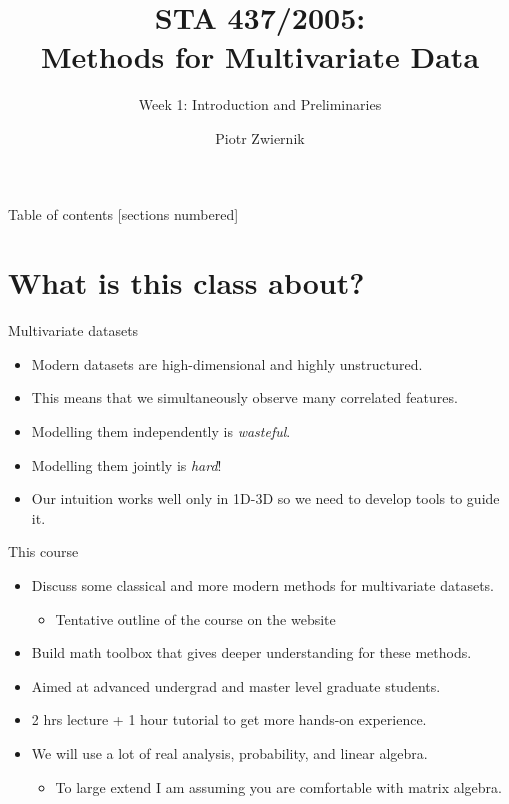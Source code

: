 \documentclass[11pt,handout,aspectratio=169]{beamer}
\title[STA437-Week1]{STA 437/2005: \\ Methods for Multivariate Data}
\subtitle[]{Week 1: Introduction and Preliminaries}
\author[Prob Learning]{Piotr Zwiernik}
\institute[UofT]{University of Toronto}
\date{}
\begin{document}
\maketitle

\begin{frame}{Table of contents}
  [sections numbered]
  \tableofcontents%
\end{frame}



\section{What is this class about?}


\begin{frame}{Multivariate datasets}
\begin{itemize}
	\item Modern datasets are high-dimensional and highly unstructured.\\[.7cm]
	\item This means that we simultaneously observe many correlated features. \\[.7cm]
	\item Modelling them independently is \emph{wasteful}.\\[.7cm]
	\item Modelling them jointly is \emph{hard}!\\[.7cm]
	\item Our intuition works well only in 1D-3D so we need to develop tools to guide it.
\end{itemize}	
\end{frame}

\begin{frame}{This course}
  \begin{itemize}
  \item Discuss some classical and more modern methods for multivariate datasets.\begin{itemize}
  	\item Tentative outline of the course on the website\\[.7cm]
  \end{itemize}
  \item Build math toolbox that gives deeper understanding for these methods.\\[.7cm]
  \item Aimed at advanced undergrad and master level graduate students. \\[.7cm]
  \item 2 hrs lecture + 1 hour tutorial to get more hands-on experience. \\[.7cm]
  \item We will use \alert{a lot of} real analysis, probability, and linear algebra. 
  \begin{itemize}
\item To large extend I am assuming you are comfortable with matrix algebra. 
  \end{itemize}  
  \end{itemize}
\end{frame}
\end{document}
